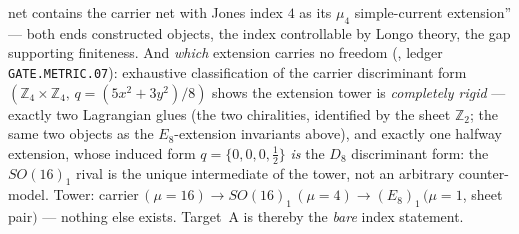 \begin{winbox}
net contains the carrier net with Jones index $4$ as its $\mu_4$ simple-current extension'' --- both ends
constructed objects, the index controllable by Longo theory, the gap supporting finiteness. And \emph{which}
extension carries no freedom (, ledger \texttt{GATE.METRIC.07}): exhaustive
classification of the carrier discriminant form $(\mathbb Z_4{\times}\mathbb Z_4,\,q{=}(5x^2{+}3y^2)/8)$ shows the
extension tower is \emph{completely rigid} --- exactly two Lagrangian glues (the two chiralities, identified
by the sheet $\mathbb Z_2$; the same two objects as the $E_8$-extension invariants above), and exactly one halfway
extension, whose induced form $q=\{0,0,0,\tfrac12\}$ \emph{is} the $D_8$ discriminant form: the $SO(16)_1$
rival is the unique intermediate of the tower, not an arbitrary counter-model. Tower:
carrier\,$(\mu{=}16)\to SO(16)_1\,(\mu{=}4)\to(E_8)_1\,(\mu{=}1$, sheet pair$)$ --- nothing else exists.
Target~A is thereby the \emph{bare} index statement.


\end{winbox}
